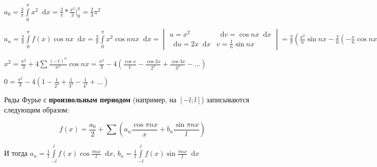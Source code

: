 \documentclass{article}
\newcommand*\diff{\mathop{}\!\mathrm{d}}
\begin{document}
$a_0 = \frac{2}{\pi} \int\limits_{0}^{\pi} x^2 \diff x = \frac{2}{\pi} * \frac{x^3}{3} \bigg|_{0}^{\pi} = \frac{2}{3} \pi^2$

$a_{n} = \frac{2}{\pi} \int\limits_{0}^{\pi} f(x) \cos n x \diff x = \frac{2}{\pi} \int\limits_{0}^{\pi} x^2 \cos n n x \diff x = \begin{vmatrix}
    u = x^2 & \diff v = \cos n x \diff x \\
    \diff u = 2x \diff x & v = \frac{1}{n} \sin n x
\end{vmatrix} = \frac{2}{\pi} (\frac{x^2}{n} \sin n x - \frac{2}{n} (-\frac{x}{n} \cos n x + \frac{1}{n^2} \sin n x)) \bigg|_{0}^{\pi} = \frac{4}{\pi n^2} (\pi \cos \pi n - 0) = \frac{4 \cos \pi n}{n^2} = \frac{4}{n^2} (-1)^{n}$

\hfill

$x^2 = \frac{\pi^2}{3} + 4 \sum \frac{(-1)^{n}}{n^2} \cos n x = \frac{\pi^2}{3} - 4 (\frac{\cos x}{1} - \frac{\cos 2 x}{2^2} + \frac{\cos 3 x}{3^2} - \dots)$

$0 = \frac{\pi^2}{3} - 4 (1 - \frac{1}{2^2} + \frac{1}{3^2} - \frac{1}{4^2} + \dots)$

\hfill

Ряды Фурье с \textbf{произвольным периодом} (например, на $[-l; l]$) записываются следующим образом:

$$f(x) = \frac{a_0}{2} + \sum (a_{n} \frac{\cos \pi n x}{x} + b_{n} \frac{\sin \pi n x}{l})$$

И тогда $a_{n} = \frac{1}{l} \int\limits_{- l}^{l} f(x) \cos \frac{\pi n x}{l} \diff x$, $b_{n} = \frac{1}{l} \int\limits_{- l}^{l} f(x) \sin \frac{\pi n x}{l} \diff x$
\end{document}
